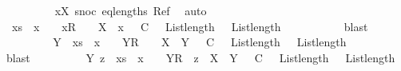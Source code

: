 \begin{isabellebody}
\ \ \ \ \ \ \ \ \isamarkupfalse%
\ xX{}\ snoc\ eq{\isacharunderscore}lengths\ Ref\ \isamarkupfalse%
\ auto\isanewline
\ \ \ \ \ \ \isamarkupfalse%
\ \isamarkupfalse%
\ {\isachardoublequoteopen}{\isasymexists}{\isasymrho}\ xs\ {\isacharat}\ {\isacharbrackleft}x{\isacharbrackright}\ {\isacharequal}\ {\isasymrho}\ {\isacharat}\ {\isacharbrackleft}{\isacharbrackleft}x{}{\isacharbrackright}\isactrlsub R{\isacharbrackright}\ {\isacharat}\ {\isacharbrackleft}{\isacharbrackright}\ {\isasymand}\ X\ {\isasymsubseteq}\ x{}\ {\isasymand}\ {\isasymrho}\ {\isasymlesssim}\isactrlsub C\ {\isasymrho}\ {\isasymand}\ List{\isachardot}length\ {\isacharparenleft}{\isasymrho}\ {\isacharequal}\ List{\isachardot}length\ {\isacharparenleft}{\isasymrho}{\isacharparenright}{\isachardoublequoteclose}\isanewline
\ \ \ \ \ \ \ \ \isamarkupfalse%
\ blast\isanewline
\ \ \ \ \ \ \isamarkupfalse%
\ \isamarkupfalse%
\ {\isachardoublequoteopen}{\isasymexists}Y\ {\isasymrho}\ xs\ {\isacharat}\ {\isacharbrackleft}x{\isacharbrackright}\ {\isacharequal}\ {\isasymrho}\ {\isacharat}\ {\isacharbrackleft}{\isacharbrackleft}Y{\isacharbrackright}\isactrlsub R{\isacharbrackright}\ {\isacharat}\ {\isacharbrackleft}{\isacharbrackright}\ {\isasymand}\ X\ {\isasymsubseteq}\ Y\ {\isasymand}\ {\isasymrho}\ {\isasymlesssim}\isactrlsub C\ {\isasymrho}\ {\isasymand}\ List{\isachardot}length\ {\isacharparenleft}{\isasymrho}\ {\isacharequal}\ List{\isachardot}length\ {\isacharparenleft}{\isasymrho}{\isacharparenright}{\isachardoublequoteclose}\isanewline
\ \ \ \ \ \ \ \ \isamarkupfalse%
\ blast\isanewline
\ \ \ \ \ \ \isamarkupfalse%
\ \isamarkupfalse%
\ {\isachardoublequoteopen}{\isasymexists}Y\ z\ {\isasymrho}\ xs\ {\isacharat}\ {\isacharbrackleft}x{\isacharbrackright}\ {\isacharequal}\ {\isasymrho}\ {\isacharat}\ {\isacharbrackleft}{\isacharbrackleft}Y{\isacharbrackright}\isactrlsub R{\isacharbrackright}\ {\isacharat}\ z\ {\isasymand}\ X\ {\isasymsubseteq}\ Y\ {\isasymand}\ {\isasymrho}\ {\isasymlesssim}\isactrlsub C\ {\isasymrho}\ {\isasymand}\ List{\isachardot}length\ {\isacharparenleft}{\isasymrho}\ {\isacharequal}\ List{\isachardot}length\ {\isacharparenleft}{\isasymrho}{\isacharparenright}{\isachardoublequoteclose}\isanewline

\end{isabellebody}
